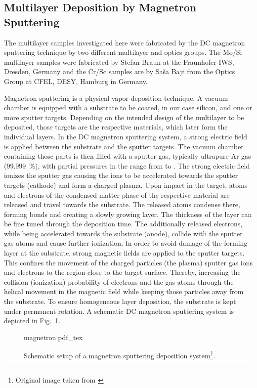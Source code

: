\subsection{Multilayer Deposition by Magnetron Sputtering} \label{ch_exp:sec_magnetron_sputtering}
The multilayer samples investigated here were fabricated by the DC magnetron sputtering technique \cite{stearns_fabrication_1991} by two different multilayer and optics groups. The Mo/Si multilayer samples were fabricated by Stefan Braun at the Fraunhofer IWS, Dresden, Germany and the Cr/Sc samples are by Sa\v{s}a Bajt from the Optics Group at CFEL, DESY, Hamburg in Germany.

Magnetron sputtering is a physical vapor deposition technique. A vacuum chamber is equipped with a substrate to be coated, in our case silicon, and one or more sputter targets. Depending on the intended design of the multilayer to be deposited, those targets are the respective materials, which later form the individual layers. In the DC magnetron sputtering system, a strong electric field is applied between the substrate and the sputter targets. The vacuum chamber containing those parts is then filled with a sputter gas, typically ultrapure Ar gas (\SI{99.999}{\percent}), with partial pressures in the range from  to  \cite{stearns_fabrication_1991}. The strong electric field ionizes the sputter gas causing the ions to be accelerated towards the sputter targets (cathode) and form a charged plasma. Upon impact in the target, atoms and electrons of the condensed matter phase of the respective material are released and travel towards the substrate. The released atoms condense there, forming bonds and creating a slowly growing layer. The thickness of the layer can be fine tuned through the deposition time. The additionally released electrons, while being accelerated towards the substrate (anode), collide with the sputter gas atoms and cause further ionization. In order to avoid damage of the forming layer at the substrate, strong magnetic fields are applied to the sputter targets. This confines the movement of the charged particles (the plasma) sputter gas ions and electrons to the region close to the target surface. Thereby, increasing the collision (ionization) probability of electrons and the gas atoms through the helical movement in the magnetic field while keeping those particles away from the substrate. To ensure homogeneous layer deposition, the substrate is kept under permanent rotation. A schematic DC magnetron sputtering system is depicted in Fig.~\ref{ch_exp:magnetron_sputtering_schematic}.
\begin{figure}[htb]
        \def\svgwidth{0.65\textwidth}
	{magnetron.pdf_tex}
        \caption[Schematic setup of a magnetron sputtering deposition system.]{%
            Schematic setup of a magnetron sputtering deposition system\footnote{Original image taken from \textcite{stearns_fabrication_1991}}.}
        \label{ch_exp:magnetron_sputtering_schematic}
\end{figure}


